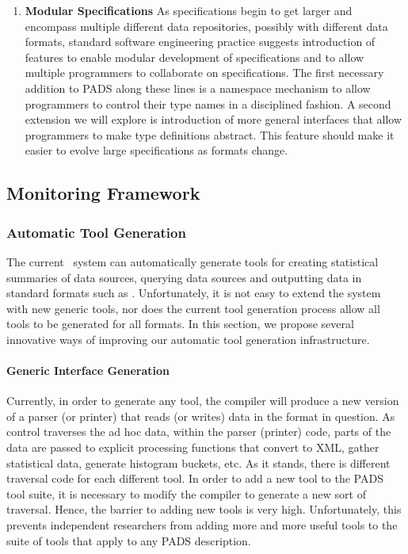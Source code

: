 \documentclass[11pt]{article}
\begin{document}
\begin{enumerate}

\item {\bf Modular Specifications}
As specifications begin to get larger and encompass multiple different data repositories,
possibly with different data formats, standard software engineering practice suggests
introduction of features to enable modular development of specifications and to allow multiple
programmers to collaborate on specifications.  The first necessary addition to PADS along these 
lines is a namespace mechanism to allow programmers to control their type names in a disciplined fashion.
A second extension we will explore is introduction of more general interfaces that allow programmers
to make type definitions abstract.  This feature should make it easier to evolve large specifications as
formats change.

\end{enumerate}

\subsection{Monitoring Framework}


\subsubsection{Automatic Tool Generation}

The current \pads{}\ system can automatically generate tools for
creating statistical summaries of data sources, querying
data sources and outputting data in standard formats such as
\xml.  Unfortunately, it is not easy to extend the system with new generic tools,
nor does the current tool generation process allow all tools to be generated for all formats.
In this section, we propose several innovative ways of improving our
automatic tool generation infrastructure.

\paragraph*{Generic Interface Generation}
Currently, in order to generate any tool, the \pads{} compiler will 
produce a new version of a parser (or printer) that reads (or writes)
data in the format in question.  As control traverses the ad hoc data, within the parser (printer) code,
parts of the data are passed to explicit processing functions that 
convert to XML, gather statistical data, generate histogram buckets, etc.
As it stands, there is different traversal code for each different tool.
In order to add a new tool to the PADS tool suite, it is necessary to modify the compiler
to generate a new sort of traversal.  Hence, the barrier to adding new tools
is very high.  Unfortunately, this prevents independent researchers from adding more and more
useful tools to the suite of tools that apply to any PADS description.
\end{document}
